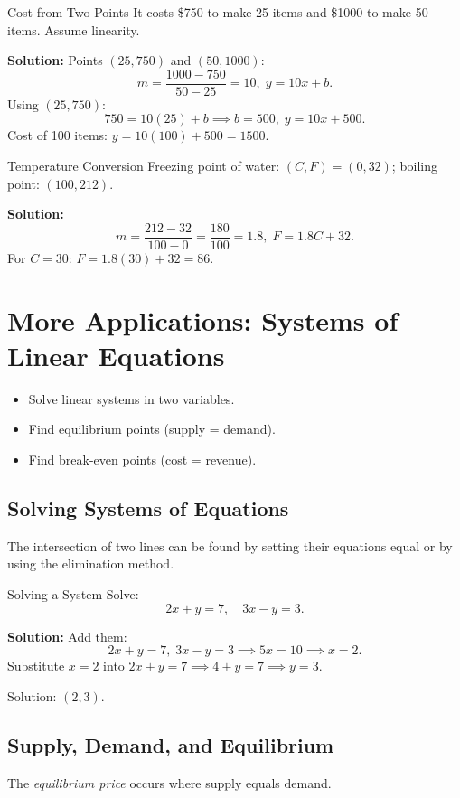 \begin{example}{Cost from Two Points}\label{exa:cost-two-points}
It costs \$750 to make 25 items and \$1000 to make 50 items. Assume linearity.

\textbf{Solution:} Points $(25,750)$ and $(50,1000)$:
\[
m=\frac{1000-750}{50-25}=10,\;y=10x+b.
\]
Using $(25,750)$:
\[
750=10(25)+b \implies b=500,\;y=10x+500.
\]
Cost of 100 items: $y=10(100)+500=1500.$
\end{example}

\begin{example}{Temperature Conversion}\label{exa:temp-conversion}
Freezing point of water: $(C,F)=(0,32)$; boiling point: $(100,212)$.

\textbf{Solution:}
\[
m=\frac{212-32}{100-0}=\frac{180}{100}=1.8,\;F=1.8C+32.
\]
For $C=30$: $F=1.8(30)+32=86.$
\end{example}

\section{More Applications: Systems of Linear Equations}
\begin{outcome}
\begin{itemize}
\item Solve linear systems in two variables.
\item Find equilibrium points (supply = demand).
\item Find break-even points (cost = revenue).
\end{itemize}
\end{outcome}

\subsection*{Solving Systems of Equations}
The intersection of two lines can be found by setting their equations equal or by using the elimination method.

\begin{example}{Solving a System}\label{exa:system-solve}
Solve:
\[
2x+y=7,\quad 3x-y=3.
\]

\textbf{Solution:} Add them:
\[
2x+y=7,\;3x-y=3 \implies 5x=10 \implies x=2.
\]
Substitute $x=2$ into $2x+y=7 \implies 4+y=7 \implies y=3.$

Solution: $(2,3)$.
\end{example}

\subsection*{Supply, Demand, and Equilibrium}
The \emph{equilibrium price} occurs where supply equals demand.

